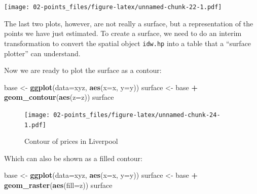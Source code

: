 \documentclass[]{book}
\newenvironment{Shaded}{\begin{snugshade}}{\end{snugshade}}
\newcommand{\DataTypeTok}[1]{\textcolor[rgb]{0.13,0.29,0.53}{#1}}
\newcommand{\DecValTok}[1]{\textcolor[rgb]{0.00,0.00,0.81}{#1}}
\newcommand{\KeywordTok}[1]{\textcolor[rgb]{0.13,0.29,0.53}{\textbf{#1}}}
\newcommand{\NormalTok}[1]{#1}
\newcommand{\OperatorTok}[1]{\textcolor[rgb]{0.81,0.36,0.00}{\textbf{#1}}}
\newcommand{\StringTok}[1]{\textcolor[rgb]{0.31,0.60,0.02}{#1}}
\begin{document}
\texttt{[image: 02-points\_files/figure-latex/unnamed-chunk-22-1.pdf]}

The last two plots, however, are not really a surface, but a representation of the points we have just estimated. To create a surface, we need to do an interim transformation to convert the spatial object \texttt{idw.hp} into a table that a ``surface plotter'' can understand.

\begin{Shaded}
\end{Shaded}

Now we are ready to plot the surface as a contour:

\begin{Shaded}
\begin{Highlighting}[]
\NormalTok{base <-}\StringTok{ }\KeywordTok{ggplot}\NormalTok{(}\DataTypeTok{data=}\NormalTok{xyz, }\KeywordTok{aes}\NormalTok{(}\DataTypeTok{x=}\NormalTok{x, }\DataTypeTok{y=}\NormalTok{y))}
\NormalTok{surface <-}\StringTok{ }\NormalTok{base }\OperatorTok{+}\StringTok{ }\KeywordTok{geom_contour}\NormalTok{(}\KeywordTok{aes}\NormalTok{(}\DataTypeTok{z=}\NormalTok{z))}
\NormalTok{surface}
\end{Highlighting}
\end{Shaded}

\begin{figure}
\centering
\texttt{[image: 02-points\_files/figure-latex/unnamed-chunk-24-1.pdf]}
\caption{\label{fig:unnamed-chunk-24}Contour of prices in Liverpool}
\end{figure}

Which can also be shown as a filled contour:

\begin{Shaded}
\begin{Highlighting}[]
\NormalTok{base <-}\StringTok{ }\KeywordTok{ggplot}\NormalTok{(}\DataTypeTok{data=}\NormalTok{xyz, }\KeywordTok{aes}\NormalTok{(}\DataTypeTok{x=}\NormalTok{x, }\DataTypeTok{y=}\NormalTok{y))}
\NormalTok{surface <-}\StringTok{ }\NormalTok{base }\OperatorTok{+}\StringTok{ }\KeywordTok{geom_raster}\NormalTok{(}\KeywordTok{aes}\NormalTok{(}\DataTypeTok{fill=}\NormalTok{z))}
\NormalTok{surface}
\end{Highlighting}
\end{Shaded}
\end{document}
